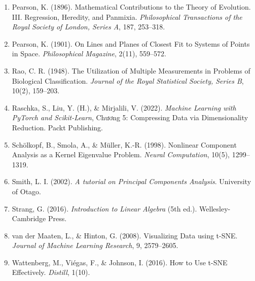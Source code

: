\begin{enumerate}
    \item Pearson, K. (1896). Mathematical Contributions to the Theory of Evolution. III. Regression, Heredity, and Panmixia. \textit{Philosophical Transactions of the Royal Society of London, Series A}, 187, 253--318.
    \item Pearson, K. (1901). On Lines and Planes of Closest Fit to Systems of Points in Space. \textit{Philosophical Magazine}, 2(11), 559--572.
    \item Rao, C. R. (1948). The Utilization of Multiple Measurements in Problems of Biological Classification. \textit{Journal of the Royal Statistical Society, Series B}, 10(2), 159--203.
    \item Raschka, S., Liu, Y. (H.), \& Mirjalili, V. (2022). \textit{Machine Learning with PyTorch and Scikit-Learn}, Chương 5: Compressing Data via Dimensionality Reduction. Packt Publishing.
    \item Schölkopf, B., Smola, A., \& Müller, K.-R. (1998). Nonlinear Component Analysis as a Kernel Eigenvalue Problem. \textit{Neural Computation}, 10(5), 1299--1319.
    \item Smith, L. I. (2002). \textit{A tutorial on Principal Components Analysis}. University of Otago.
    \item Strang, G. (2016). \textit{Introduction to Linear Algebra} (5th ed.). Wellesley-Cambridge Press.
    \item van der Maaten, L., \& Hinton, G. (2008). Visualizing Data using t-SNE. \textit{Journal of Machine Learning Research}, 9, 2579--2605.
    \item Wattenberg, M., Viégas, F., \& Johnson, I. (2016). How to Use t-SNE Effectively. \textit{Distill}, 1(10).
\end{enumerate}
